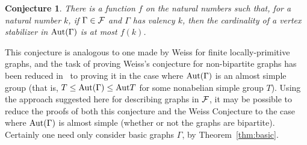 \documentclass[12pt, a4paper]{article}
\newtheorem{conjecture}[theorem]{Conjecture}
\def\Ga{\Gamma}
\begin{document}
\begin{conjecture} 
There is a function $f$ on the natural numbers such that,
for a natural number $k$, if $\Gamma \in {\cal F}$ and $\Gamma$ has
valency $k$, then the cardinality of a vertex stabilizer in $\mbox{\rm Aut}(\Gamma)$
is at most $f(k)$.
\end{conjecture}
 
This conjecture is analogous to one made by Weiss for
finite locally-primitive graphs, and the task of proving Weiss's
conjecture for non-bipartite graphs has been reduced in~\cite{clp} to
proving it in the case 
where $\mbox{\rm Aut}(\Gamma)$ is an almost simple group 
(that is, $T \leq \mbox{\rm Aut}(\Gamma)
\leq \mbox{\rm Aut} T$ for some nonabelian simple group $T$).
Using the approach suggested here for describing graphs in ${\cal F}$,
it may be possible to reduce the proofs of both this conjecture and
the Weiss Conjecture to the case
where $\mbox{\rm Aut}(\Gamma)$ is almost simple (whether or not the
graphs are bipartite).
Certainly one need only consider basic graphs $\Ga$, by Theorem~\ref{thm:basic}.
\end{document}
